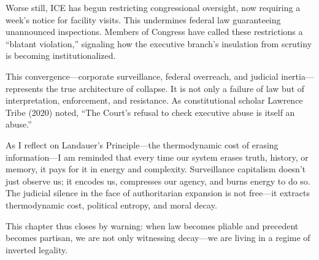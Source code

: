 \documentclass[
]{article}
\begin{document}
Worse still, ICE has begun restricting congressional oversight, now requiring a week's notice for facility visits. This undermines federal law guaranteeing unannounced inspections. Members of Congress have called these restrictions a ``blatant violation,'' signaling how the executive branch's insulation from scrutiny is becoming institutionalized.

This convergence---corporate surveillance, federal overreach, and judicial inertia---represents the true architecture of collapse. It is not only a failure of law but of interpretation, enforcement, and resistance. As constitutional scholar Lawrence Tribe (2020) noted, ``The Court's refusal to check executive abuse is itself an abuse.''

As I reflect on Landauer's Principle---the thermodynamic cost of erasing information---I am reminded that every time our system erases truth, history, or memory, it pays for it in energy and complexity. Surveillance capitalism doesn't just observe us; it encodes us, compresses our agency, and burns energy to do so. The judicial silence in the face of authoritarian expansion is not free---it extracts thermodynamic cost, political entropy, and moral decay.

This chapter thus closes by warning: when law becomes pliable and precedent becomes partisan, we are not only witnessing decay---we are living in a regime of inverted legality.
\end{document}
